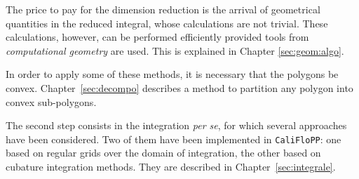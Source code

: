 The price to pay for the dimension reduction is the arrival of
geometrical quantities in the reduced integral, whose calculations are
not trivial. These calculations, however, can be performed efficiently
provided tools from \emph{computational geometry} are used. This is
explained in Chapter \ref{sec:geom:algo}.

In order to apply some of these methods, it is necessary that the
polygons be convex. Chapter~\ref{sec:decompo} describes a method to
partition any polygon into convex sub-polygons.

\medskip

The second step consists in the integration \emph{per se}, for which
several approaches have been considered.
Two of them have been implemented in \verb+CaliFloPP+:
one based on regular grids over the domain of integration,
the other based on cubature integration methods.
They are described in Chapter~\ref{sec:integrale}.


